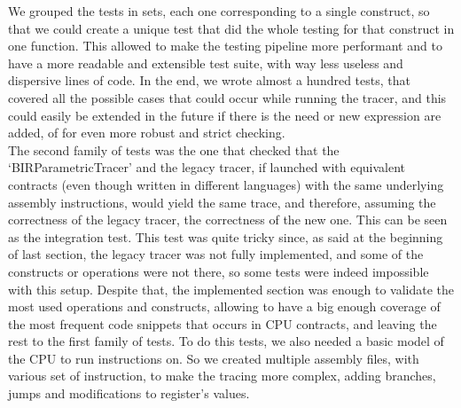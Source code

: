 We grouped the tests in sets, each one corresponding to a single construct, so that
we could create a unique test that did the whole testing for that construct in one
function. This allowed to make the testing pipeline more performant and to have
a more readable and extensible test suite, with way less useless and dispersive lines
of code. In the end, we wrote almost a hundred tests, that covered all the
possible cases that could occur while running the tracer, and this could easily be
extended in the future if there is the need or new expression are added, of for
even more robust and strict checking. \\

The second family of tests was the one that checked that the `BIRParametricTracer'
and the legacy tracer, if launched with equivalent contracts (even though
written in different languages) with the same underlying assembly instructions,
would yield the same trace, and therefore, assuming the correctness of the
legacy tracer, the correctness of the new one. This can be seen as the
integration test. This test was quite tricky since, as said at the beginning of
last section, the legacy tracer was not fully implemented, and some of the
constructs or operations were not there, so some tests were indeed impossible with
this setup. Despite that, the implemented section was enough to validate the most
used operations and constructs, allowing to have a big enough coverage of the
most frequent code snippets that occurs in CPU contracts, and leaving the rest to
the first family of tests. To do this tests, we also needed a basic model of the
CPU to run instructions on. So we created multiple assembly files, with various set
of instruction, to make the tracing more complex, adding branches, jumps and
modifications to register's values.

